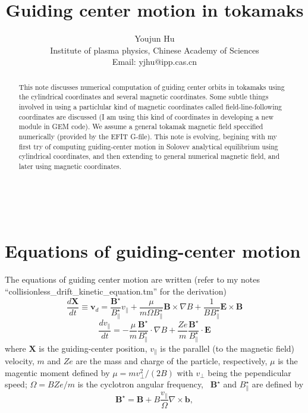 \documentclass{article}
\newcommand{\tmaffiliation}[1]{\\ #1}
\begin{document}
\title{Guiding center motion in tokamaks}

\author{
  Youjun Hu
  \tmaffiliation{Institute of plasma physics, Chinese Academy of Sciences\\
  Email: yjhu@ipp.cas.cn}
}

\maketitle

\begin{abstract}
  This note discusses numerical computation of guiding center orbits in
  tokamaks using the cylindrical coordinates and several magnetic coordinates.
  Some subtle things involved in using a particlular kind of magnetic
  coordinates called field-line-following coordinates are discussed (I am
  using this kind of coordinates in developing a new module in GEM code). We
  assume a general tokamak magnetic field speccified numerically (provided by
  the EFIT G-file). This note is evolving, begining with my first try of
  computing guiding-center motion in Solovev analytical equilibrium using
  cylindrical coordinates, and then extending to general numerical magnetic
  field, and later using magnetic coordinates.
\end{abstract}

\

\section{\label{5-15-e1}Equations of guiding-center motion}

The equations of guiding center motion are written{\cite{todo2006}} (refer to
my notes ``collisionless\_drift\_kinetic\_equation.tm'' for the derivation)
\begin{equation}
  \label{5-15-p2} \frac{d\mathbf{X}}{d t} \equiv \mathbf{v}_d =
  \frac{\mathbf{B}^{\star}}{B^{\star}_{\parallel}} v_{\parallel} +
  \frac{\mu}{m \Omega B^{\star}_{\parallel}} \mathbf{B} \times \nabla B +
  \frac{1}{B B^{\star}_{\parallel}} \mathbf{E} \times \mathbf{B}
\end{equation}
\begin{equation}
  \label{16-7-4-7} \frac{d v_{\parallel}}{d t} = - \frac{\mu}{m} 
  \frac{\mathbf{B}^{\star}}{B^{\star}_{\parallel}} \cdot \nabla B + \frac{Z
  e}{m}  \frac{\mathbf{B}^{\star}}{B^{\star}_{\parallel}} \cdot \mathbf{E}
\end{equation}
where $\mathbf{X}$ is the guiding-center position, $v_{\parallel}$ is the
parallel (to the magnetic field) velocity, $m$ and $Z e$ are the mass and
charge of the particle, respectively, $\mu$ is the magentic moment defined by
$\mu = m v_{\perp}^2 / (2 B)$ with $v_{\perp}$ being the pependicular speed;
$\Omega = B Z e / m$ is the cyclotron angular frequency, \
$\mathbf{B}^{\star}$ and $B^{\star}_{\parallel}$ are defined by
\begin{equation}
  \mathbf{B}^{\star} =\mathbf{B}+ B \frac{v_{\parallel}}{\Omega} \nabla \times
  \mathbf{b},
\end{equation}
\end{document}
